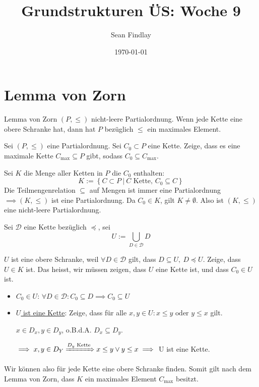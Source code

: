 \documentclass[12pt]{article}
\title{Grundstrukturen ÜS: Woche 9}
\author{Sean Findlay}
\date{\today}
\begin{document}
\maketitle

\section{Lemma von Zorn}

\begin{lemma}{Lemma von Zorn}{}
    $(P, \leq)$ nicht-leere Partialordnung. Wenn jede Kette eine obere Schranke hat, dann hat $P$ bezüglich $\leq$ ein maximales Element.
\end{lemma}

\begin{exercise}{}{}
    Sei $(P, \leq)$ eine Partialordnung. Sei $C_0 \subset P$ eine Kette. Zeige, dass es eine maximale Kette $C_{\text{max}} \subseteq P$ gibt, sodass $C_0 \subseteq C_{\text{max}}$.
\end{exercise}

\begin{proofbox}
    Sei $K$ die Menge aller Ketten in $P$ die $C_0$ enthalten:
    $$
        K := \left\{ C \subset P \ |\ C \text{ Kette, } C_0 \subseteq C \right\}
    $$
    Die Teilmengenrelation $\subseteq$ auf Mengen ist immer eine Partialordnung $\implies (K, \leq)$ ist eine Partialordnung. Da $C_0 \in K$, gilt $K \neq \emptyset$. Also ist $(K, \leq)$ eine nicht-leere Partialordnung.

    Sei $\mathcal{D}$ eine Kette bezüglich $\preceq$, sei
    $$
        U := \bigcup\limits_{D \in \mathcal{D}} D
    $$

    $U$ ist eine obere Schranke, weil $\forall D \in \mathcal{D}$ gilt, dass $D \subseteq U,\ D \preceq U$. Zeige, dass $U \in K$ ist. Das heisst, wir müssen zeigen, dass $U$ eine Kette ist, und dass $C_0 \in U$ ist.

    \begin{itemize}
        \item \underline{$C_0 \in U$}: $\forall D \in \mathcal{D} : C_0 \subseteq D \implies C_0 \subseteq U$
        \item \underline{$U$ ist eine Kette}: Zeige, dass für alle $x, y \in U: x \leq y \text{ oder } y \leq x$ gilt.
        
        $x \in D_x, y \in D_y$, o.B.d.A. $D_x \subseteq D_y$.

        $\implies x, y \in D_Y \xRightarrow{D_y \text{ Kette}} x \leq y \lor y \leq x \implies$ U ist eine Kette.
    \end{itemize}

    Wir können also für jede Kette eine obere Schranke finden. Somit gilt nach dem Lemma von Zorn, dass $K$ ein maximales Element $C_{\text{max}}$ besitzt.
\end{proofbox}
\end{document}

